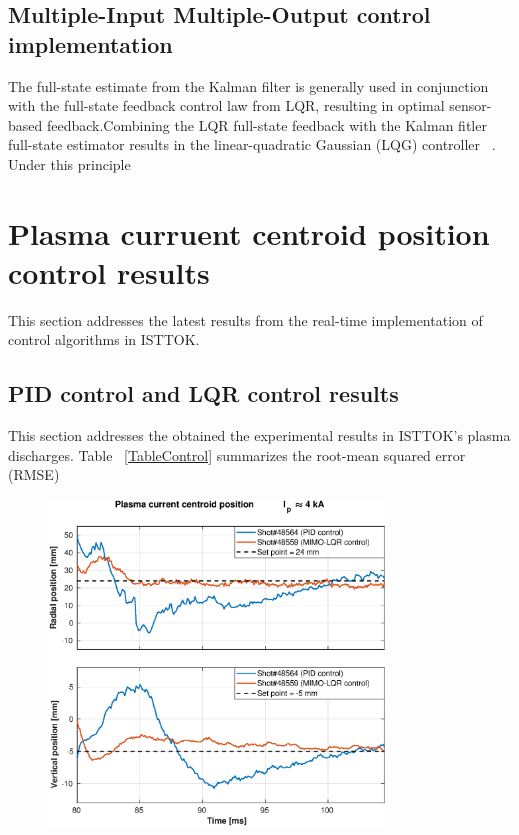 \subsection{Multiple-Input Multiple-Output control implementation}
	
The full-state estimate from the Kalman filter is generally used in conjunction with the
full-state feedback control law from LQR, resulting in optimal sensor-based feedback.Combining the LQR full-state feedback with the Kalman fitler full-state estimator results in the linear-quadratic Gaussian (LQG) controller ~\cite[Chapter~8]{DataDriven2019}. Under this principle 
\smallskip



\section{Plasma curruent centroid position control results}

This section addresses the latest results from the real-time implementation of control algorithms in ISTTOK. 

\subsection{PID control and LQR control results}

This section addresses the obtained the experimental results in ISTTOK's plasma discharges. Table ~\ref{TableControl} summarizes the root-mean squared error (RMSE)

\begin{figure}
	\centering
	\includegraphics[width=0.8\textwidth]{Chp5/PIDvsMIMO_564_559_2.eps}
	\label{564_559}
\end{figure}

